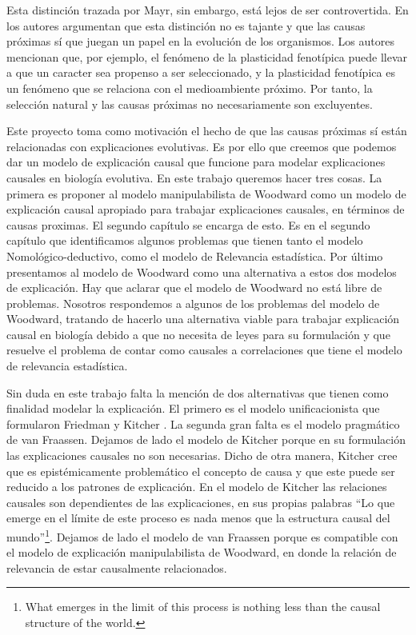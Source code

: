 Esta distinción trazada por Mayr, sin embargo, está lejos de ser controvertida. En \cite{Laland2011} los autores argumentan que esta distinción no es tajante y que las causas próximas sí que juegan un papel en la evolución de los organismos. Los autores mencionan que, por ejemplo, el fenómeno de la plasticidad fenotípica puede llevar a que un caracter sea propenso a ser seleccionado, y la plasticidad fenotípica es un fenómeno que se relaciona con el medioambiente próximo. Por tanto, la selección natural y las causas próximas no necesariamente son excluyentes.

Este proyecto toma como motivación el hecho de que las causas próximas sí están relacionadas con explicaciones evolutivas. Es por ello que creemos que podemos dar un modelo de explicación causal que funcione para modelar explicaciones causales en biología evolutiva. En este trabajo queremos hacer tres cosas. La primera es proponer al modelo manipulabilista de Woodward  \cite{Woodward2000, Woodward2003} como un modelo de explicación causal apropiado para trabajar explicaciones causales, en términos de causas proximas. El segundo capítulo se encarga de esto. Es en el segundo capítulo que identificamos algunos problemas que tienen tanto el modelo Nomológico-deductivo, como el modelo de Relevancia estadística. Por último presentamos al modelo de Woodward como una alternativa a estos dos modelos de explicación. Hay que aclarar que el modelo de Woodward no está libre de problemas. Nosotros respondemos a algunos de los problemas del modelo de Woodward, tratando de hacerlo una alternativa viable para trabajar explicación causal en biología debido a que no necesita de leyes para su formulación y que resuelve el problema de contar como causales a correlaciones que tiene el modelo de relevancia estadística.

Sin duda en este trabajo falta la mención de dos alternativas que tienen como finalidad modelar la explicación. El primero es el modelo unificacionista que formularon Friedman \citeyear{Friedman1974} y Kitcher \cite{Kitcher2002}. La segunda gran falta es el modelo pragmático de van Fraassen. Dejamos de lado el modelo de Kitcher porque en su formulación las explicaciones causales no son necesarias. Dicho de otra manera, Kitcher cree que es epistémicamente problemático el concepto de causa y que este puede ser reducido a los patrones de explicación. En el modelo de Kitcher las relaciones causales son dependientes de las explicaciones, en sus propias palabras ``Lo que emerge en el límite de este proceso es nada menos que la estructura causal del mundo''\footnote{What emerges in the limit of this process is nothing less than the causal structure of the world.}. Dejamos de lado el modelo de van Fraassen porque es compatible con el modelo de explicación manipulabilista de Woodward, en donde la relación de relevancia de estar causalmente relacionados.

